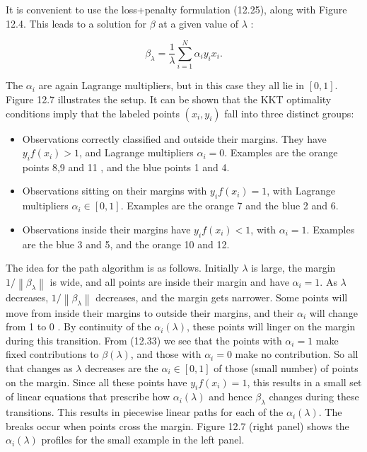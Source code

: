 \documentclass[10pt]{article}
\begin{document}
It is convenient to use the loss+penalty formulation (12.25), along with Figure 12.4. This leads to a solution for $\beta$ at a given value of $\lambda$ :


\begin{equation*}
\beta_{\lambda}=\frac{1}{\lambda} \sum_{i=1}^{N} \alpha_{i} y_{i} x_{i} . \tag{12.33}
\end{equation*}


The $\alpha_{i}$ are again Lagrange multipliers, but in this case they all lie in $[0,1]$.\\
Figure 12.7 illustrates the setup. It can be shown that the KKT optimality conditions imply that the labeled points $\left(x_{i}, y_{i}\right)$ fall into three distinct groups:

\begin{itemize}
  \item Observations correctly classified and outside their margins. They have $y_{i} f\left(x_{i}\right)>1$, and Lagrange multipliers $\alpha_{i}=0$. Examples are the orange points 8,9 and 11 , and the blue points 1 and 4.
  \item Observations sitting on their margins with $y_{i} f\left(x_{i}\right)=1$, with Lagrange multipliers $\alpha_{i} \in[0,1]$. Examples are the orange 7 and the blue 2 and 6.
  \item Observations inside their margins have $y_{i} f\left(x_{i}\right)<1$, with $\alpha_{i}=1$. Examples are the blue 3 and 5, and the orange 10 and 12.
\end{itemize}

The idea for the path algorithm is as follows. Initially $\lambda$ is large, the margin $1 /\left\|\beta_{\lambda}\right\|$ is wide, and all points are inside their margin and have $\alpha_{i}=1$. As $\lambda$ decreases, $1 /\left\|\beta_{\lambda}\right\|$ decreases, and the margin gets narrower. Some points will move from inside their margins to outside their margins, and their $\alpha_{i}$ will change from 1 to 0 . By continuity of the $\alpha_{i}(\lambda)$, these points will linger on the margin during this transition. From (12.33) we see that the points with $\alpha_{i}=1$ make fixed contributions to $\beta(\lambda)$, and those with $\alpha_{i}=0$ make no contribution. So all that changes as $\lambda$ decreases are the $\alpha_{i} \in[0,1]$ of those (small number) of points on the margin. Since all these points have $y_{i} f\left(x_{i}\right)=1$, this results in a small set of linear equations that prescribe how $\alpha_{i}(\lambda)$ and hence $\beta_{\lambda}$ changes during these transitions. This results in piecewise linear paths for each of the $\alpha_{i}(\lambda)$. The breaks occur when points cross the margin. Figure 12.7 (right panel) shows the $\alpha_{i}(\lambda)$ profiles for the small example in the left panel.
\end{document}
